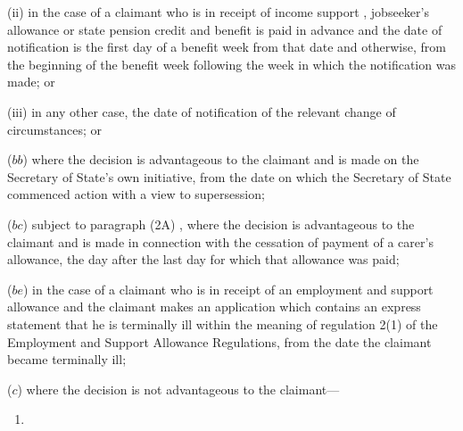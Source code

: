 \documentclass[12pt,a4paper]{article}
\begin{document}
\begin{enumerate}
\begin{enumerate}
(ii) in the case of a claimant who is in receipt of income support%
, jobseeker's allowance or state pension credit  %
and benefit is paid in advance and the date of notification is the first day of a benefit week from that date and otherwise, from the beginning of the benefit week following the week in which the notification was made; or

(iii) in any other case, the date of notification of the relevant change of circumstances; or
\end{enumerate}

($bb$) where the decision is advantageous to the claimant and is made on the Secretary of State’s own initiative, from the date on which the Secretary of State commenced action with a view to supersession;

($bc$) 
subject to 
paragraph (2A)%
,  %
where the decision is advantageous to the claimant and is made in connection with the cessation of payment of a carer’s allowance, the day after the last day for which that allowance was paid;


($be$) in the case of a claimant who is in receipt of an employment and support allowance and the claimant makes an application which contains an express statement that he is terminally ill within the meaning of regulation 2(1) of the Employment and Support Allowance Regulations, from the date the claimant became terminally ill;

($c$) where the decision is not advantageous to the claimant—
\begin{enumerate}\item[]


\end{enumerate}
\end{enumerate}
\end{document}
